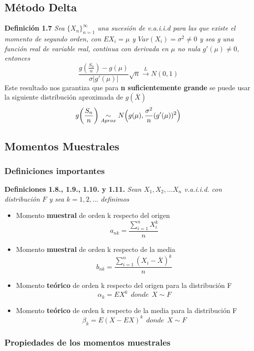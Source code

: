 \subsection{Método Delta}

	 \noindent \textbf{Definición 1.7} \textit{Sea $\{X_n\}^{\infty}_{n=1}$ una sucesión de v.a.i.i.d para las que existe el momento de segundo orden, con  $EX_i=\mu$ y $Var(X_i)=\sigma^{2}\neq 0$ y sea g una función real de variable real, continua con derivada en $\mu$ no nula $g'(\mu)\neq 0$, entonces} $$\frac{g(\frac{S_n}{n})-g(\mu)}{\sigma |g'(\mu)|}\sqrt{n}\xrightarrow{L}N(0,1)$$ Este resultado nos garantiza que para \textbf{n suficientemente grande} se puede usar la siguiente distribución aproximada de $g(\overline{X})$ $$g\biggl(\frac{S_n}{n}\biggr)\underset{Aprox}{\sim}N\Bigl(g(\mu), \frac{\sigma^{2}}{n}(g'(\mu))^{2}\Bigr)$$\pagebreak
	 
	\subsection{Momentos Muestrales}
	
	\subsubsection{Definiciones importantes}
	
	\noindent\textbf{Definiciones 1.8., 1.9., 1.10. y 1.11. }\textit{Sean $X_1, X_2,...X_n$ v.a.i.i.d. con distribución $F$ y sea $k=1,2,...$ definimos}
	
	\begin{itemize}
		\item Momento \textbf{muestral} de orden k respecto del origen
		$$a_{nk}=\frac{\displaystyle\sum_{i=1}^{n}X_{i}^{k}}{n}$$
		
		\item Momento \textbf{muestral} de orden k respecto de la media
		$$b_{nk}=\frac{\displaystyle\sum_{i=1}^{n}(X_{i}-\overline{X})^{k}}{n}$$
		
		\item Momento \textbf{teórico} de orden k respecto del origen para la distribución F
		$$\alpha_k=EX^k\ \ donde\ \ X\sim F$$
		
		\item Momento \textbf{teórico} de orden k respecto de la media para la distribución F
		$$\beta_k=E(X-EX)^k\ \ donde\ \ X\sim F$$
	\end{itemize}
	
	\subsubsection{Propiedades de los momentos muestrales}
	
